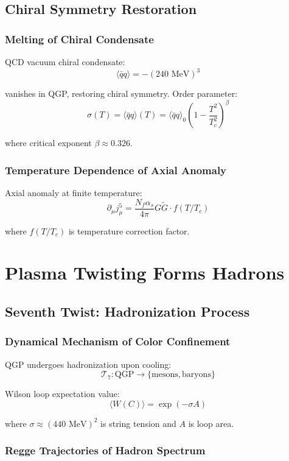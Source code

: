 \documentclass[11pt]{article}
\begin{document}
\subsection{Chiral Symmetry Restoration}

\subsubsection{Melting of Chiral Condensate}

QCD vacuum chiral condensate:
$$\langle \bar{q}q \rangle = -(240 \text{ MeV})^3$$

vanishes in QGP, restoring chiral symmetry. Order parameter:
$$\sigma(T) = \langle \bar{q}q \rangle(T) = \langle \bar{q}q \rangle_0 \left(1 - \frac{T^2}{T_c^2}\right)^{\beta}$$

where critical exponent $\beta \approx 0.326$.

\subsubsection{Temperature Dependence of Axial Anomaly}

Axial anomaly at finite temperature:
$$\partial_{\mu} j_{\mu}^5 = \frac{N_f \alpha_s}{4\pi} G \tilde{G} \cdot f(T/T_c)$$

where $f(T/T_c)$ is temperature correction factor.

\section{Plasma Twisting Forms Hadrons}

\subsection{Seventh Twist: Hadronization Process}

\subsubsection{Dynamical Mechanism of Color Confinement}

QGP undergoes hadronization upon cooling:
$$\mathcal{T}_7: \text{QGP} \to \{\text{mesons}, \text{baryons}\}$$

Wilson loop expectation value:
$$\langle W(C) \rangle = \exp(-\sigma A)$$

where $\sigma \approx (440 \text{ MeV})^2$ is string tension and $A$ is loop area.

\subsubsection{Regge Trajectories of Hadron Spectrum}
\end{document}
